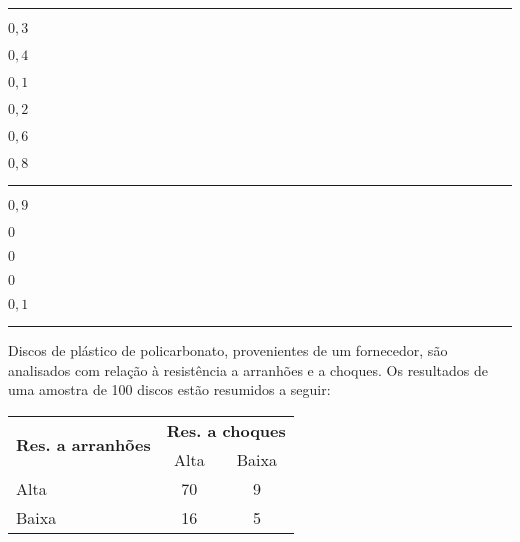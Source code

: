 \documentclass[a4paper,11pt,fleqn]{article}\usepackage[]{graphicx}\usepackage[]{color}
\theoremstyle{definition}
\begin{document}
\begin{compactenum}
\vspace{0.3cm}
\hrule
\vspace{0.3cm}

\item
    \begin{inparaenum}
    \item $0,3$
    \item $0,4$
    \item $0,1$
    \item $0,2$
    \item $0,6$
    \item $0,8$
    \end{inparaenum}

\vspace{0.3cm}
\hrule
\vspace{0.3cm}

\item
    \begin{inparaenum}
    \item $0,9$
    \item $0$
    \item $0$
    \item $0$
    \item $0,1$
    \end{inparaenum}

\vspace{0.3cm}
\hrule
\vspace{0.3cm}

\item Discos de plástico de policarbonato, provenientes de um fornecedor,
  são analisados com relação à resistência a arranhões e a choques. Os
  resultados de uma amostra de 100 discos estão resumidos a seguir:
  \begin{table}[!h]
    \centering
    \begin{tabular}{lcc}
      \hline
      \multirow{2}{*}{\textbf{Res. a arranhões}}
      & \multicolumn{2}{l}{\textbf{Res. a choques}} \\
      \cline{2-3}
                & Alta         & Baixa       \\
      \hline
      Alta      & 70           & 9           \\
      Baixa     & 16           & 5           \\
      \hline
    \end{tabular}
  \end{table}


\end{compactenum}
\end{document}
